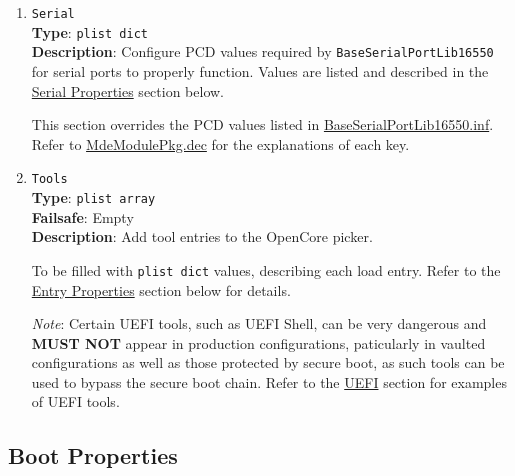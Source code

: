 \documentclass[]{article}
\begin{document}
\begin{enumerate}
\item
  \texttt{Serial}\\
  \textbf{Type}: \texttt{plist\ dict}\\
  \textbf{Description}: Configure PCD values required by \texttt{BaseSerialPortLib16550}
  for serial ports to properly function. Values are listed and described in the
  \hyperref[miscserialprops]{Serial Properties} section below.

  This section overrides the PCD values listed in
  \href{https://github.com/acidanthera/audk/blob/master/MdeModulePkg/Library/BaseSerialPortLib16550/BaseSerialPortLib16550.inf}{BaseSerialPortLib16550.inf}.
  Refer to \href{https://github.com/acidanthera/audk/blob/master/MdeModulePkg/MdeModulePkg.dec}{MdeModulePkg.dec} for the explanations of each key.

\item
  \texttt{Tools}\label{misctools}\\
  \textbf{Type}: \texttt{plist\ array}\\
  \textbf{Failsafe}: Empty\\
  \textbf{Description}: Add tool entries to the OpenCore picker.

  To be filled with \texttt{plist\ dict} values, describing each load entry.
  Refer to the \hyperref[miscentryprops]{Entry Properties} section below for details.

  \emph{Note}: Certain UEFI tools, such as UEFI Shell, can be very dangerous and
  \textbf{MUST NOT} appear in production configurations, paticularly in vaulted
  configurations as well as those protected by secure boot, as such tools can be
  used to bypass the secure boot chain.
  Refer to the \hyperref[uefitools]{UEFI} section for examples of UEFI tools.

\end{enumerate}

\subsection{Boot Properties}\label{miscbootprops}
\end{document}
